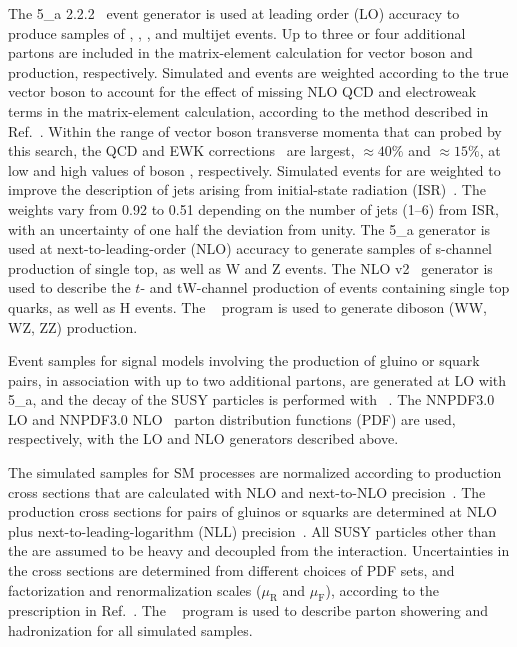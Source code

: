 The {\MADGRAPH{}5\_a\MCATNLO} 2.2.2~\cite{Alwall2014} event generator
is used at leading order (LO) accuracy to produce samples of \wj, \zj,
\ttbar, and multijet events. Up to three or four additional partons
are included in the matrix-element calculation for vector boson and
\ttbar production, respectively. Simulated \wj and \zj events are
weighted according to the true vector boson \pt %
to account for the effect of missing NLO QCD and electroweak terms in
the matrix-element calculation, according to the method described in
Ref.~\cite{Khachatryan:2016mdm}. Within the range of vector boson
transverse momenta that can probed by this search, the QCD and EWK
corrections~\cite{Kuhn:2005gv} are largest, ${\approx}40\%$ and
${\approx}15\%$, at low and high values of boson \pt,
respectively. Simulated events for \ttbar are weighted to improve the
description of jets arising from initial-state radiation
(ISR)~\cite{single-lepton-stop}. The weights vary from 0.92 to 0.51
depending on the number of jets (1--6) from ISR, with an uncertainty
of one half the deviation from unity. The {\MADGRAPH{}5\_a\MCATNLO}
generator is used at next-to-leading-order (NLO) accuracy to generate
samples of s-channel production of single top, as well as {\ttbar}W
and {\ttbar}Z events. The NLO \POWHEG v2~\cite{powheg, powheg_top_Wt}
generator is used to describe the $t$- and tW-channel production of
events containing single top quarks, as well as {\ttbar}H events. The
~\cite{pythia} program is used to generate diboson (WW, WZ,
ZZ) production. 

Event samples for signal models involving the production of gluino or
squark pairs, in association with up to two additional partons, are
generated at LO with {\MADGRAPH{}5\_a\MCATNLO}, and the decay of the
SUSY particles is performed with ~\cite{pythia}. The
\textsc{NNPDF}3.0 LO and \textsc{NNPDF}3.0 NLO~\cite{nnpdf} parton
distribution functions (PDF) are used, respectively, with the LO and
NLO generators described above.

The simulated samples for SM processes are normalized according to
production cross sections that are calculated with NLO and next-to-NLO
precision~\cite{Alwall2014, wphys, fewz, wwxs, top++, nlotop,
  powheg_top_Wt}. The production cross sections for pairs of gluinos
or squarks are determined at NLO plus next-to-leading-logarithm (NLL)
precision~\cite{Beenakker:1996ch, Kulesza:2008jb, Kulesza:2009kq,
  Beenakker:2009ha, Beenakker:2011fu, Borschensky:2014cia}. All SUSY
particles other than the \PSGczDo are assumed to be heavy and
decoupled from the interaction. Uncertainties in the cross sections
are determined from different choices of PDF sets, and factorization
and renormalization scales ($\mu_\text{R}$ and $\mu_\text{F}$),
according to the prescription in Ref.~\cite{Borschensky:2014cia}. The
~\cite{pythia} program is used to describe parton showering
and hadronization for all simulated samples.

